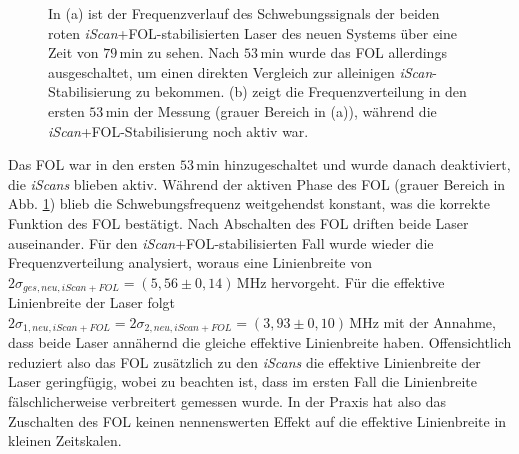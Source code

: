 \begin{figure}[hp]
 	\centering
 	\footnotesize
 	\fbox{\parbox{\dimexpr \linewidth - 2\fboxrule - 2\fboxsep}{
 	\subfloat[]{
		\label{subfig:beatfrequenzen_neu_iScan+FOL_drift}
		
		}\\
 	\subfloat[]{
		\label{subfig:beatfrequenzen_neu_iScan+FOL_histogramm}
		
		}
	}}
	\caption[Beatfrequenzen - neues System mit \textit{iScan}+FOL]{In (a) ist der
	Frequenzverlauf des Schwebungssignals der beiden roten
	\textit{iScan}+FOL-stabilisierten Laser des neuen Systems über eine Zeit von
	$79\,$min zu sehen. Nach $53\,$min wurde das FOL allerdings ausgeschaltet, um
	einen direkten Vergleich zur alleinigen \textit{iScan}-Stabilisierung zu
	bekommen. (b) zeigt die Frequenzverteilung in den ersten $53\,$min der Messung
	(grauer Bereich in (a)), während die \textit{iScan}+FOL-Stabilisierung noch
	aktiv war.}
	\label{fig:beatfrequenzen_neu_iScan+FOL}
\end{figure}
Das FOL war in den ersten $53\,$min hinzugeschaltet und wurde danach
deaktiviert, die \textit{iScans} blieben aktiv. Während der aktiven Phase des
FOL (grauer Bereich in Abb.
\ref{fig:beatfrequenzen_neu_iScan+FOL})
blieb die Schwebungsfrequenz weitgehendst konstant, was die korrekte Funktion des FOL bestätigt. Nach
Abschalten des FOL driften beide Laser auseinander. Für den
\textit{iScan}+FOL-stabilisierten Fall wurde wieder die Frequenzverteilung
analysiert, woraus eine Linienbreite von
$2\sigma_{ges,neu,iScan+FOL}=(5,56\pm0,14)\,$MHz hervorgeht. Für die effektive
Linienbreite der Laser folgt
$2\sigma_{1,neu,iScan+FOL}=2\sigma_{2,neu,iScan+FOL}=(3,93\pm0,10)\,$MHz mit
der Annahme, dass beide Laser annähernd die gleiche effektive Linienbreite haben.
Offensichtlich reduziert also das FOL zusätzlich zu den \textit{iScans} die
effektive Linienbreite der Laser geringfügig, wobei zu beachten ist, dass im
ersten Fall die Linienbreite fälschlicherweise verbreitert gemessen wurde. In der
Praxis hat also das Zuschalten des FOL keinen nennenswerten Effekt auf die
effektive Linienbreite in kleinen Zeitskalen.

